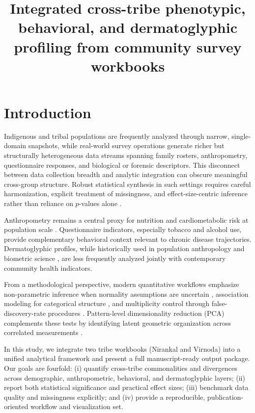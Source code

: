\documentclass[pdflatex,sn-mathphys-num]{sn-jnl}
\title[Cross-tribe phenotypic and behavioral structure]{Integrated cross-tribe phenotypic, behavioral, and dermatoglyphic profiling from community survey workbooks}
\author*[1]{\fnm{Ranji} \sur{Kolkar}}\email{ranji.kolkar@example.com}
\author[1]{\fnm{Swea} \sur{Nidhi}}\email{swea.nidhi@example.com}
\affil[1]{\orgname{Independent Research Collaboration}, \orgaddress{\city{Goa}, \country{India}}}
\begin{document}
\maketitle

\section{Introduction}
Indigenous and tribal populations are frequently analyzed through narrow, single-domain snapshots, while real-world survey operations generate richer but structurally heterogeneous data streams spanning family rosters, anthropometry, questionnaire responses, and biological or forensic descriptors. This disconnect between data collection breadth and analytic integration can obscure meaningful cross-group structure. Robust statistical synthesis in such settings requires careful harmonization, explicit treatment of missingness, and effect-size-centric inference rather than reliance on \(p\)-values alone \cite{rubin1976,little2002,vanbuuren2018,cohen1988,cliff1993}.

Anthropometry remains a central proxy for nutrition and cardiometabolic risk at population scale \cite{who1995,who2000,wells2006}. Questionnaire indicators, especially tobacco and alcohol use, provide complementary behavioral context relevant to chronic disease trajectories. Dermatoglyphic profiles, while historically used in population anthropology and biometric science \cite{galton1892,henry1900,cummins1961,holt1968}, are less frequently analyzed jointly with contemporary community health indicators.

From a methodological perspective, modern quantitative workflows emphasize non-parametric inference when normality assumptions are uncertain \cite{mann1947,wilcoxon1945}, association modeling for categorical structure \cite{agresti2013,cramer1946}, and multiplicity control through false-discovery-rate procedures \cite{benjamini1995}. Pattern-level dimensionality reduction (PCA) complements these tests by identifying latent geometric organization across correlated measurements \cite{pearson1901,hotelling1933,jolliffe2002,kaiser1960}.

In this study, we integrate two tribe workbooks (Nirankal and Virnoda) into a unified analytical framework and present a full manuscript-ready output package. Our goals are fourfold: (i) quantify cross-tribe commonalities and divergences across demographic, anthropometric, behavioral, and dermatoglyphic layers; (ii) report both statistical significance and practical effect sizes; (iii) benchmark data quality and missingness explicitly; and (iv) provide a reproducible, publication-oriented workflow and visualization set.
\end{document}
